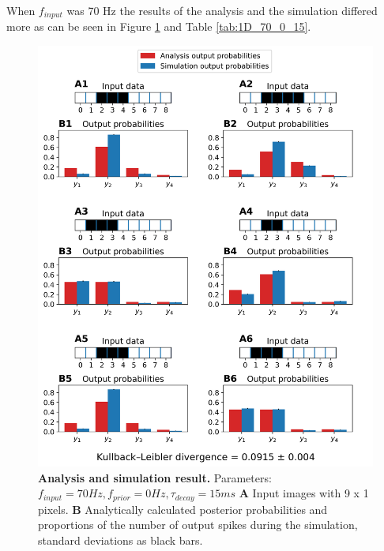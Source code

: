 When $f_{input}$ was 70 Hz the results of the analysis and the simulation differed more as can be seen in Figure \ref{fig:1D_70_0_15} and Table \ref{tab:1D_70_0_15}.

\begin{figure}
  \includegraphics[width=\linewidth]{figures/1D/1D_70_0_15.png}
    \caption{\textbf{Analysis and simulation result. } Parameters: $f_{input} = 70 Hz, f_{prior} = 0 Hz, \tau_{decay} = 15 ms$ \textbf{A} Input images with 9 x 1 pixels. \textbf{B} Analytically calculated posterior probabilities and proportions of the number of output spikes during the simulation, standard deviations as black bars.}
  \label{fig:1D_70_0_15}
\end{figure}

